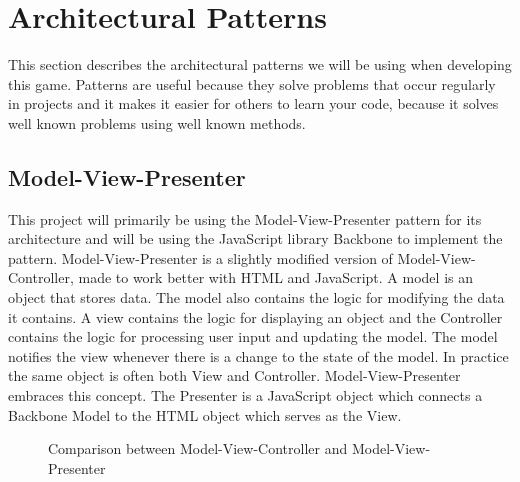 \section{Architectural Patterns}
This section describes the architectural patterns we will be using when developing this game. Patterns
are useful because they solve problems that occur regularly in projects and it makes it easier for 
others to learn your code, because it solves well known problems using well known methods.

\subsection*{Model-View-Presenter}
This project will primarily be using the Model-View-Presenter pattern for its architecture and will 
be using the JavaScript library Backbone to implement the pattern. Model-View-Presenter is a slightly
modified version of Model-View-Controller, made to work better with HTML and JavaScript. A model is 
an object that stores data. The model also contains the logic for modifying the data it contains. 
A view contains the logic for displaying an object and the Controller contains the logic for 
processing user input and updating the model. The model notifies the view whenever there is a change
to the state of the model. In practice the same object is often both View and Controller. 
Model-View-Presenter embraces this concept. The Presenter is a JavaScript object which connects a 
Backbone Model to the HTML object which serves as the View. 
\cite{mvp}

\begin{figure}[H]
	\centering
	\caption{Comparison between Model-View-Controller and Model-View-Presenter}
\end{figure}

